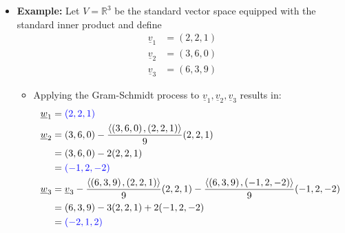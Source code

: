 \documentclass[11pt,twoside]{report}
\newcommand{\bbR}{{\mathbb{R}}}
\newcommand{\vecnot}{\underline}
\newcommand{\Span}{\mathrm{span}}
\newcommand{\inner}[2]{{\left\langle #1 \mskip2mu , #2 \right\rangle}}
\begin{document}
\begin{itemize}
\begin{itemize}
\item Assume that $\vecnot{w}_{1}, \dots, \vecnot{w}_m$ are orthogonal with 
\[
\Span(\vecnot{w}_{1} , \dots, \vecnot{w}_m ) = \Span(\vecnot{v}_{1} , \dots, \vecnot{v}_m )
\]


\item  This implies that $\vecnot{w}_{m+1} \ne 0$. Otherwise, $\vecnot{v}_{m+1}$ would be a linear combination of $\vecnot{w}_1, \ldots, \vecnot{w}_m$ and hence a linear combination of $\vecnot{v}_1, \ldots, \vecnot{v}_m$, thus contradicting the linear independence of $\vecnot{v}_{1} , \dots, \vecnot{v}_m$. 

\item  Moreover,  $\vecnot{w}_{m+1}$ and $\vecnot{w}_j$ are orthogonal for $j=1,\ldots,m$: 
\begin{alignat*}{3}
\inner{ \vecnot{w}_{m+1} }{ \vecnot{w}_j }
&= \inner{ \vecnot{v}_{m+1} }{ \vecnot{w}_j }
- \sum_{i=1}^m \frac{ \inner{ \vecnot{v}_{m+1} }{ \vecnot{w}_i } } { \left\| \vecnot{w}_i \right\|^2 }
\inner{ \vecnot{w}_i }{ \vecnot{w}_j } &\qquad&\text{linearity in 1st arg.} \\
&= \inner{ \vecnot{v}_{m+1} }{ \vecnot{w}_j }
- \frac{ \inner{ \vecnot{v}_{m+1} }{ \vecnot{w}_j } } { \left\| \vecnot{w}_j \right\|^2 }   \inner{\vecnot{w}_{j} }{ \vecnot{w}_j }&\quad & %
\text{since $ \inner{\vecnot{v}_{m+1} }{ \vecnot{w}_i } = \delta_{ij}$}\\
& = 0
\end{alignat*}
\end{itemize}



\item \textbf{Example:} Let $V = \bbR^3$ be the standard vector space equipped with the standard inner product and define 
\begin{align*}
\vecnot{v}_1 &= (2,2,1) \\
\vecnot{v}_2 &= (3,6,0) \\
\vecnot{v}_3 &= (6,3,9)
\end{align*}

\begin{itemize}
\item Applying the Gram-Schmidt process to $\vecnot{v}_1, \vecnot{v}_2, \vecnot{v}_3$ results in: 
\begin{align*}
\vecnot{w}_1 &= \textcolor{blue}{(2,2,1)} \\
\vecnot{w}_2 &= (3,6,0)
- \frac{ \inner{ (3,6,0) }{ (2,2,1) } }{ 9 } (2,2,1) \\
&= (3,6,0) - 2 (2,2,1) \\
& = \textcolor{blue}{(-1,2,-2)} \\
\vecnot{w}_3 &= \vecnot{v}_3
- \frac{ \inner{ (6,3,9) }{ (2,2,1) } }{ 9 } (2,2,1)
- \frac{ \inner{ (6,3,9) }{ (-1,2,-2) } }{ 9 } (-1,2,-2) \\
&= (6,3,9) - 3 (2,2,1) + 2 (-1,2,-2)\\
&  = \textcolor{blue}{(-2,1,2)}
\end{align*}




\end{itemize}
\end{itemize}
\end{document}
